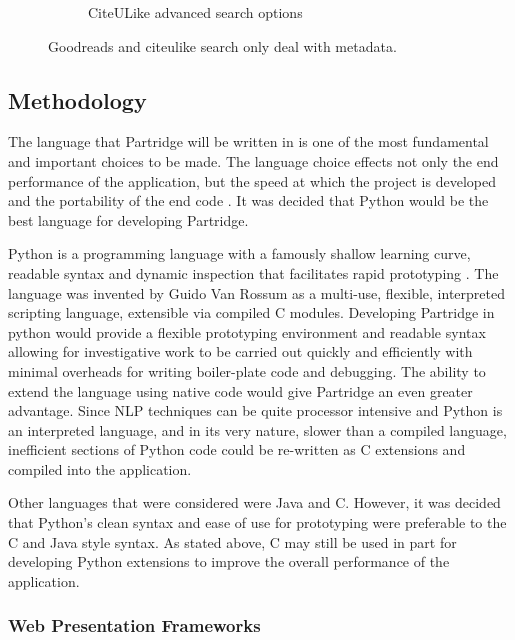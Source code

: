 \documentclass[12pt,a4paper]{article}
\begin{document}
\begin{figure}[!hbt]
\begin{subfigure}[b]{0.50\textwidth}
                \caption{CiteULike advanced search options}
                \label{fig:citeulike_search}
        \end{subfigure}

        \caption{Goodreads and citeulike search only deal with metadata.}
        \label{fig:social_searches}
\end{figure}


\subsection{Methodology}

The language that Partridge will be written in is one of the most fundamental
and important choices to be made. The language choice effects not only the end
performance of the application, but the speed at which the project is developed
and the portability of the end code \cite{britton2008}. It was decided that
Python would be the best language for developing Partridge.

Python is a programming language with a famously shallow learning curve,
readable syntax and dynamic inspection that facilitates rapid prototyping
\cite{bird2009natural}. The language was invented by Guido Van Rossum as a
multi-use, flexible, interpreted scripting language, extensible via compiled C
modules\cite{An93pythonfor}. Developing Partridge in python
would provide a flexible prototyping environment and readable syntax allowing
for investigative work to be carried out quickly and efficiently with minimal
overheads for writing boiler-plate code and debugging. The ability to extend
the language using native code would give Partridge an even greater advantage.
Since NLP techniques can be quite processor intensive and Python is an
interpreted language, and in its very nature, slower than a compiled language,
inefficient sections of Python code could be re-written as C extensions and
compiled into the application. 

Other languages that were considered were Java and C. However, it was decided
that Python's clean syntax and ease of use for prototyping were preferable to
the C and Java style syntax. As stated above, C may still be used in part for
developing Python extensions to improve the overall performance of the
application.

\subsubsection{Web Presentation Frameworks} 
\end{document}
